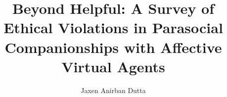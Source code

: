 \documentclass[sigplan,screen]{acmart}
\begin{document}
\title{Beyond Helpful: A Survey of Ethical Violations in Parasocial Companionships with Affective Virtual Agents}

\author{Jaxen Anirban Dutta}

\renewcommand{\shortauthors}{Dutta}


\end{document}
